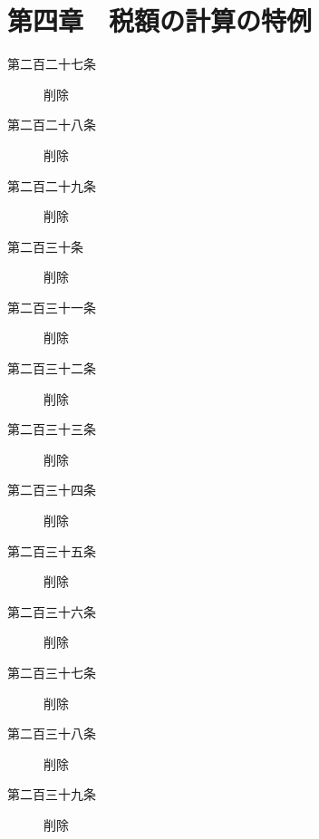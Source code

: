 \documentclass[twocolumn,a4j,10pt]{ltjtarticle}
\begin{document}
\section*{第四章　税額の計算の特例}
\begin{description}
\item[第二百二十七条]削除
\end{description}
\begin{description}
\item[第二百二十八条]削除
\end{description}
\begin{description}
\item[第二百二十九条]削除
\end{description}
\begin{description}
\item[第二百三十条]削除
\end{description}
\begin{description}
\item[第二百三十一条]削除
\end{description}
\begin{description}
\item[第二百三十二条]削除
\end{description}
\begin{description}
\item[第二百三十三条]削除
\end{description}
\begin{description}
\item[第二百三十四条]削除
\end{description}
\begin{description}
\item[第二百三十五条]削除
\end{description}
\begin{description}
\item[第二百三十六条]削除
\end{description}
\begin{description}
\item[第二百三十七条]削除
\end{description}
\begin{description}
\item[第二百三十八条]削除
\end{description}
\begin{description}
\item[第二百三十九条]削除
\end{description}
\end{document}
